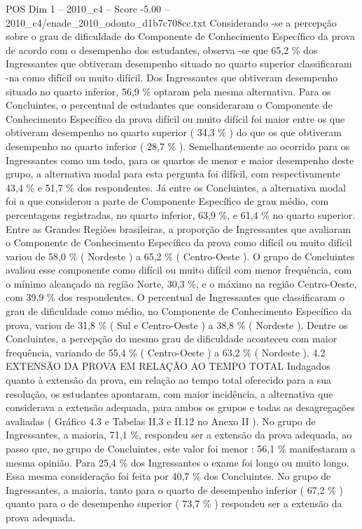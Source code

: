 \begin{textsample}{POS Dim 1 – 2010\_c4 – Score -5.00 – 2010\_c4/enade\_2010\_odonto\_d1b7c708cc.txt}
Considerando -se a percepção sobre o grau de dificuldade do Componente de Conhecimento Específico da prova de acordo com o desempenho dos estudantes, observa -se que 65,2 \% dos Ingressantes que obtiveram desempenho situado no quarto superior classificaram -na como difícil ou muito difícil.
Dos Ingressantes que obtiveram desempenho situado no quarto inferior, 56,9 \% optaram pela mesma alternativa.
Para os Concluintes, o percentual de estudantes que consideraram o Componente de Conhecimento Específico da prova difícil ou muito difícil foi maior entre os que obtiveram desempenho no quarto superior ( 34,3 \% ) do que os que obtiveram desempenho no quarto inferior ( 28,7 \% ).
Semelhantemente ao ocorrido para os Ingressantes como um todo, para os quartos de menor e maior desempenho deste grupo, a alternativa modal para esta pergunta foi difícil, com respectivamente 43,4 \% e 51,7 \% dos respondentes.
Já entre os Concluintes, a alternativa modal foi a que considerou a parte de Componente Específico de grau médio, com percentagens registradas, no quarto inferior, 63,9 \%, e 61,4 \% no quarto superior.
Entre as Grandes Regiões brasileiras, a proporção de Ingressantes que avaliaram o Componente de Conhecimento Específico da prova como difícil ou muito difícil variou de 58,0 \% ( Nordeste ) a 65,2 \% ( Centro-Oeste ).
O grupo de Concluintes avaliou esse componente como difícil ou muito difícil com menor frequência, com o mínimo alcançado na região Norte, 30,3 \%, e o máximo na região Centro-Oeste, com 39,9 \% dos respondentes.
O percentual de Ingressantes que classificaram o grau de dificuldade como médio, no Componente de Conhecimento Específico da prova, variou de 31,8 \% ( Sul e Centro-Oeste ) a 38,8 \% ( Nordeste ).
Dentre os Concluintes, a percepção do mesmo grau de dificuldade aconteceu com maior frequência, variando de 55,4 \% ( Centro-Oeste ) a 63,2 \% ( Nordeste ). 4.2 EXTENSÃO DA PROVA EM RELAÇÃO AO TEMPO TOTAL Indagados quanto à extensão da prova, em relação ao tempo total oferecido para a sua resolução, os estudantes apontaram, com maior incidência, a alternativa que considerava a extensão adequada, para ambos os grupos e todas as desagregações avaliadas ( Gráfico 4.3 e Tabelas II.3 e II.12 no Anexo II ).
No grupo de Ingressantes, a maioria, 71,1 \%, respondeu ser a extensão da prova adequada, ao passo que, no grupo de Concluintes, este valor foi menor : 56,1 \% manifestaram a mesma opinião.
Para 25,4 \% dos Ingressantes o exame foi longo ou muito longo.
Essa mesma consideração foi feita por 40,7 \% dos Concluintes.
No grupo de Ingressantes, a maioria, tanto para o quarto de desempenho inferior ( 67,2 \% ) quanto para o de desempenho superior ( 73,7 \% ) respondeu ser a extensão da prova adequada.

\end{textsample}
